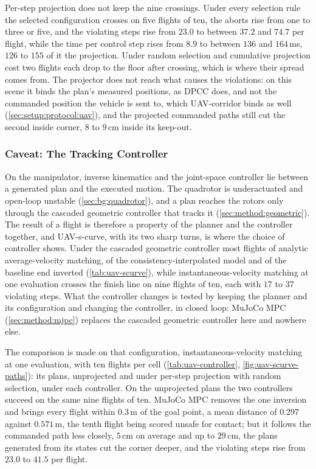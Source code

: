 Per-step projection does not keep the nine crossings. Under every selection rule the selected configuration
crosses on five flights of ten, the aborts rise from one to three or five, and the violating steps rise from
$23.0$ to between $37.2$ and $74.7$ per flight, while the time per control step rises from $8.9$ to between
$136$ and $164$\,ms, $126$ to $155$ of it the projection. Under random selection and cumulative projection cost
two flights each drop to the floor after crossing, which is where their spread comes from. The projector
does not reach what causes the violations: on this scene it binds the plan's measured positions, as \ac{DPCC}
does, and not the commanded position the vehicle is sent to, which UAV-corridor binds as well
(\autoref{sec:setup:protocol:uav}), and the projected commanded paths still cut the second inside corner,
$8$ to $9$\,cm inside its keep-out.

\subsubsection{Caveat: The Tracking Controller}\label{sec:res:uav:controller}

On the manipulator, inverse kinematics and the joint-space controller lie between a generated plan and
the executed motion. The quadrotor is underactuated and open-loop unstable
(\autoref{sec:bg:quadrotor}), and a plan reaches the rotors only through the cascaded geometric
controller that tracks it (\autoref{sec:method:geometric}). The result of a flight is therefore a
property of the planner and the controller together, and UAV-s-curve, with its two sharp turns, is where
the choice of controller shows. Under the cascaded geometric controller most flights of analytic
average-velocity matching, of the consistency-interpolated model and of the baseline end inverted
(\autoref{tab:uav-scurve}), while instantaneous-velocity matching at one evaluation crosses the finish line
on nine flights of ten, each with $17$ to $37$ violating steps. What the controller changes is tested by
keeping the planner and its configuration and changing the controller, in closed loop: MuJoCo MPC (\autoref{sec:method:mjpc}) replaces the cascaded
geometric controller here and nowhere else.

The comparison is made on that configuration, instantaneous-velocity
matching at one evaluation, with ten flights per cell (\autoref{tab:uav-controller},
\autoref{fig:uav-scurve-paths}): its plans, unprojected and under per-step projection with random selection,
under each controller. On the unprojected plans the two controllers succeed on the same nine flights of ten.
MuJoCo MPC removes the one inversion and brings every flight within $0.3$\,m of the goal point, a mean distance
of $0.297$ against $0.571$\,m, the tenth flight being scored unsafe for contact; but it follows the commanded
path less closely, $5$\,cm on average and up to $29$\,cm, the plans generated from its states cut the corner
deeper, and the violating steps rise from $23.0$ to $41.5$ per flight.

